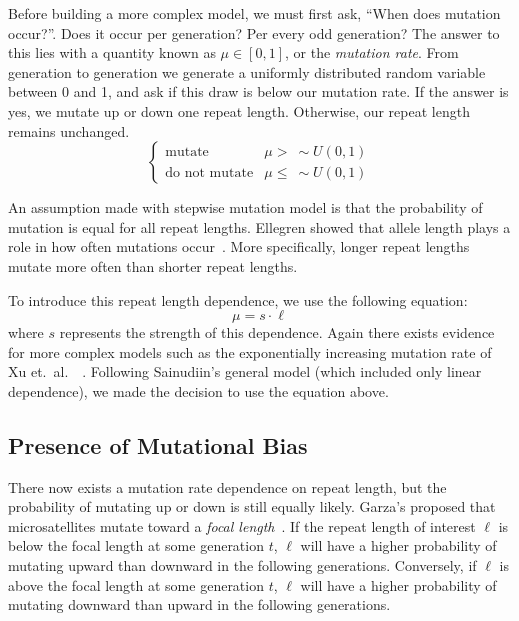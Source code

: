 Before building a more complex model, we must first ask, ``When does mutation occur?''.
Does it occur per generation?
Per every odd generation?
The answer to this lies with a quantity known as $\mu \in [0, 1]$, or the \emph{mutation rate}.
From generation to generation we generate a uniformly distributed random variable between 0 and 1, and ask if this draw
is below our mutation rate.
If the answer is yes, we mutate up or down one repeat length.
Otherwise, our repeat length remains unchanged.
\begin{equation}
    \begin{cases}
        \text{mutate} & \mu > \ \sim U(0, 1) \\
        \text{do not mutate} & \mu \leq \ \sim U(0, 1)
    \end{cases}
\end{equation}

An assumption made with stepwise mutation model is that the probability of mutation is equal for all repeat lengths.
Ellegren showed that allele length plays a role in how often mutations
occur~\cite{ellegrenHeterogeneousMutationProcesses2000}.
More specifically, longer repeat lengths mutate more often than shorter repeat lengths.

To introduce this repeat length dependence, we use the following equation:
\begin{equation}
    \mu = s \cdot \ell
\end{equation}
where $s$ represents the strength of this dependence.
Again there exists evidence for more complex models such as the exponentially increasing mutation rate of Xu et.\ al.\
~\cite{xuDirectionMicrosatelliteMutations2000}.
Following Sainudiin's general model (which included only linear dependence), we made the decision to use the equation
above.

\subsection{Presence of Mutational Bias}\label{subsec:pomb}
There now exists a mutation rate dependence on repeat length, but the probability of mutating up or down is still
equally likely.
Garza's proposed that microsatellites mutate toward a \emph{focal
length}~\cite{garzaMicrosatelliteAlleleFrequencies1995}.
If the repeat length of interest $\ell$ is below the focal length at some generation $t$, $\ell$ will have a higher
probability of mutating upward than downward in the following generations.
Conversely, if $\ell$ is above the focal length at some generation $t$, $\ell$ will have a higher probability of
mutating downward than upward in the following generations.

